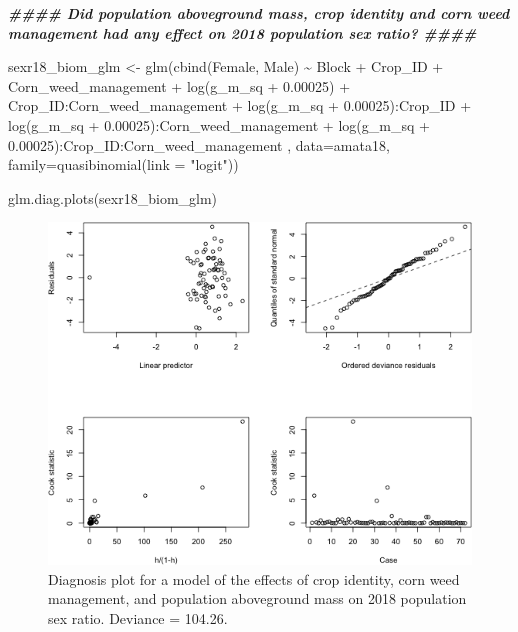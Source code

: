 \documentclass[
]{article}
\newenvironment{Shaded}{\begin{snugshade}}{\end{snugshade}}
\newcommand{\AttributeTok}[1]{\textcolor[rgb]{0.77,0.63,0.00}{#1}}
\newcommand{\DocumentationTok}[1]{\textcolor[rgb]{0.56,0.35,0.01}{\textbf{\textit{#1}}}}
\newcommand{\FloatTok}[1]{\textcolor[rgb]{0.00,0.00,0.81}{#1}}
\newcommand{\FunctionTok}[1]{\textcolor[rgb]{0.00,0.00,0.00}{#1}}
\newcommand{\NormalTok}[1]{#1}
\newcommand{\OtherTok}[1]{\textcolor[rgb]{0.56,0.35,0.01}{#1}}
\newcommand{\SpecialCharTok}[1]{\textcolor[rgb]{0.00,0.00,0.00}{#1}}
\newcommand{\StringTok}[1]{\textcolor[rgb]{0.31,0.60,0.02}{#1}}
\begin{document}
\begin{Shaded}
\begin{Highlighting}[]
\DocumentationTok{\#\#\#\# Did population aboveground mass, crop identity and corn weed management had any effect on 2018 population sex ratio? \#\#\#\#}

\NormalTok{sexr18\_biom\_glm }\OtherTok{\textless{}{-}} \FunctionTok{glm}\NormalTok{(}\FunctionTok{cbind}\NormalTok{(Female, Male) }\SpecialCharTok{\textasciitilde{}}\NormalTok{ Block }\SpecialCharTok{+}\NormalTok{  Crop\_ID }\SpecialCharTok{+}\NormalTok{ Corn\_weed\_management }\SpecialCharTok{+} 
                          \FunctionTok{log}\NormalTok{(g\_m\_sq }\SpecialCharTok{+} \FloatTok{0.00025}\NormalTok{) }\SpecialCharTok{+}
\NormalTok{                        Crop\_ID}\SpecialCharTok{:}\NormalTok{Corn\_weed\_management }\SpecialCharTok{+} 
                        \FunctionTok{log}\NormalTok{(g\_m\_sq }\SpecialCharTok{+} \FloatTok{0.00025}\NormalTok{)}\SpecialCharTok{:}\NormalTok{Crop\_ID }\SpecialCharTok{+}
                        \FunctionTok{log}\NormalTok{(g\_m\_sq }\SpecialCharTok{+} \FloatTok{0.00025}\NormalTok{)}\SpecialCharTok{:}\NormalTok{Corn\_weed\_management }\SpecialCharTok{+}
                        \FunctionTok{log}\NormalTok{(g\_m\_sq }\SpecialCharTok{+} \FloatTok{0.00025}\NormalTok{)}\SpecialCharTok{:}\NormalTok{Crop\_ID}\SpecialCharTok{:}\NormalTok{Corn\_weed\_management ,}
  \AttributeTok{data=}\NormalTok{amata18, }\AttributeTok{family=}\FunctionTok{quasibinomial}\NormalTok{(}\AttributeTok{link =} \StringTok{"logit"}\NormalTok{))}

\FunctionTok{glm.diag.plots}\NormalTok{(sexr18\_biom\_glm)}
\end{Highlighting}
\end{Shaded}

\begin{figure}
\includegraphics[width=1\linewidth]{AppendixC_model_diagnosis_files/figure-latex/sexr18-biom-1} \caption{Diagnosis plot for a model of the effects of crop identity, corn weed management, and population aboveground mass on 2018 population sex ratio. Deviance = 104.26.}\label{fig:sexr18-biom}
\end{figure}
\end{document}
